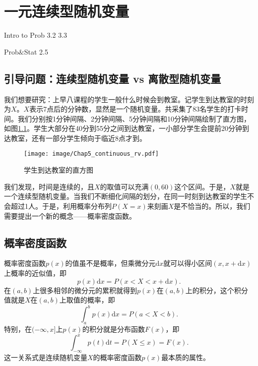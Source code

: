 \chapter{一元连续型随机变量}
\begin{introduction}
  \item Intro to Prob 3.2 3.3
  \item Prob$\&$Stat 2.5
\end{introduction}

\section{引导问题：连续型随机变量 vs 离散型随机变量}
\begin{instance}
我们想要研究：上早八课程的学生一般什么时候会到教室。记学生到达教室的时刻为$X$。$X$表示7点后的分钟数，显然是一个随机变量。共采集了83名学生的打卡时间。我们分别按1分钟间隔、2分钟间隔、5分钟间隔和10分钟间隔绘制了直方图，如图\ref{fig:chap05_continuous_rv}。学生大部分在40分到55分之间到达教室，一小部分学生会提前20分钟到达教室，还有一部分学生倾向于临近8点才到。
\begin{figure}[ht]
    \centering
    \texttt{[image: image/Chap5\_continuous\_rv.pdf]}
    \caption{学生到达教室的直方图}
    \label{fig:chap05_continuous_rv}
\end{figure}
\end{instance}

我们发现，时间是连续的，且$X$的取值可以充满$(0,60)$这个区间。于是，$X$就是一个连续型随机变量。当我们不断细化间隔的划分，在同一时刻到达教室的学生不会超过1人。于是，利用概率分布列$P(X=x)$来刻画$X$是不恰当的。所以，我们需要提出一个新的概念——概率密度函数。


\section{概率密度函数}
概率密度函数$p(x)$的值虽不是概率，但乘微分元$\text{d} x$就可以得小区间$(x,x+\text{d}x)$上概率的近似值，即
$$
p(x)\text{d}x = P(x<X<x+\text{d}x).
$$
在$(a,b)$上很多相邻的微分元的累积就得到$p(x)$在$(a,b)$上的积分，这个积分值就是$X$在$(a,b)$上取值的概率，即
$$
\int_{a}^b p(x)\text{d}x = P(a<X<b).
$$
特别，在$(-\infty,x]$上$p(x)$的积分就是分布函数$F(x)$，即
$$
\int_{-\infty}^x p(t)\text{d} t = P(X\leq x)=F(x).
$$
这一关系式是连续随机变量$X$的概率密度函数$p(x)$最本质的属性。

